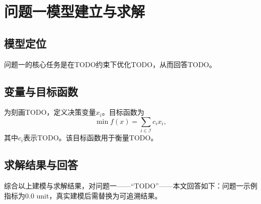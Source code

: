 \section{问题一模型建立与求解}

\subsection{模型定位}

问题一的核心任务是在TODO约束下优化TODO，从而回答TODO。

\subsection{变量与目标函数}

为刻画TODO，定义决策变量$x_i$。目标函数为
\begin{equation}
  \min f(x)=\sum_{i\in\mathcal{I}} c_i x_i,
\end{equation}
其中$c_i$表示TODO。该目标函数用于衡量TODO。

\subsection{求解结果与回答}

综合以上建模与求解结果，对问题一——``TODO''——本文回答如下：问题一示例指标为0.0 unit，真实建模后需替换为可追溯结果。
